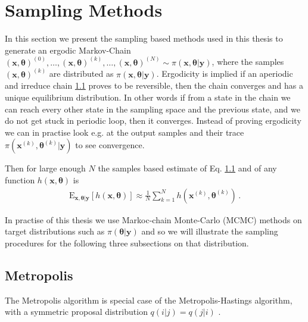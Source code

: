 \section{Sampling Methods}
In this section we present the sampling based methods used in this thesis to generate an ergodic Markov-Chain $ (\bm{x}, \bm{\theta} )^{(0)}, \dots, (\bm{x}, \bm{\theta} )^{(k)} , \dots,  (\bm{x}, \bm{\theta})^{(N)} \sim \pi(\bm{x},\bm{\theta}| \bm{y}) $, where the samples $(\bm{x}, \bm{\theta} )^{(k)}$ are distributed as $\pi(\bm{x},\bm{\theta}| \bm{y}) $.
Ergodicity is implied if an aperiodic and irreduce chain \ref{} proves to be reversible, then the chain converges and has a unique  equilibrium distribution.
In other words if from a state in the chain we can reach every other state in the sampling space and the previous state, and we do not get stuck in periodic loop, then it converges.
Instead of proving ergodicity we can in practise look e.g. at the output samples and their trace $\pi(\bm{x}^{(k)},\bm{\theta}^{(k)}| \bm{y})$ to see convergence.

Then for large enough $N$ the samples based estimate of Eq. \ref{} and of any function $h(\bm{x}, \bm{\theta})$ is
\begin{align}
	\label{eq:sampMean}
	\text{E}_{\bm{x},\bm{\theta}|\bm{y}} [h(\bm{x}, \bm{\theta})] \approx \frac{1}{N} \sum_{k=1}^{N} h(\bm{x}^{(k)},\bm{\theta}^{(k)}) \, .
\end{align}

In practise of this thesis we use Markoc-chain Monte-Carlo (MCMC) methods on target distributions such as $\pi(\bm{\theta}| \bm{y})$ and so we will illustrate the sampling procedures for the following three subsections on that distribution.

\subsection{Metropolis}

The Metropolis algorithm is special case of the Metropolis-Hastings algorithm, with a symmetric proposal distribution $q(i|j) =q(j|i) $ \cite{}.

